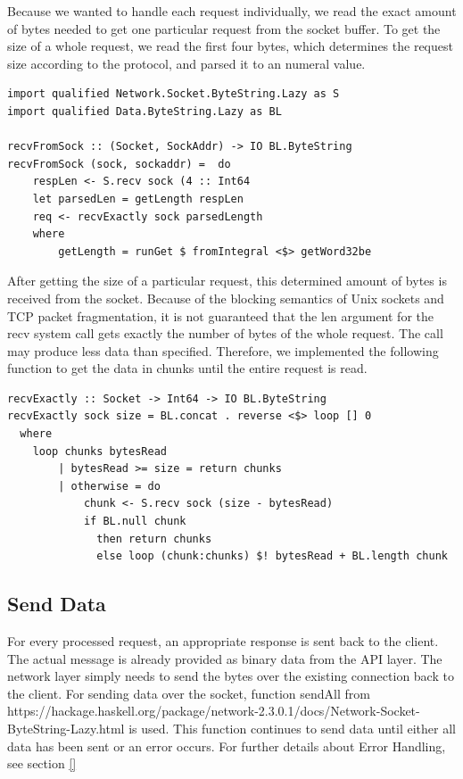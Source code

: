 Because we wanted to handle each request individually, we read
the exact amount of bytes needed to get one particular request from
the socket buffer. To get the size of a whole request, we read the first four
bytes, which determines the request size according to the protocol, and parsed it
to an numeral value.

\begin{lstlisting}[caption={Receiving data from socket}]
import qualified Network.Socket.ByteString.Lazy as S 
import qualified Data.ByteString.Lazy as BL

recvFromSock :: (Socket, SockAddr) -> IO BL.ByteString
recvFromSock (sock, sockaddr) =  do 
    respLen <- S.recv sock (4 :: Int64
    let parsedLen = getLength respLen
    req <- recvExactly sock parsedLength 
    where
        getLength = runGet $ fromIntegral <$> getWord32be
\end{lstlisting}

After getting the size of a particular request, this determined amount of bytes
is received from the socket. Because of the blocking semantics of Unix sockets and
TCP packet fragmentation, it is not guaranteed that the len argument for the recv
system call gets exactly the number of bytes of the whole request. The call may produce
less data than specified. Therefore, we implemented the following function to get
the data in chunks until the entire request is read. 

\begin{lstlisting}[caption={Receive exactly amount of bytes}]
recvExactly :: Socket -> Int64 -> IO BL.ByteString 
recvExactly sock size = BL.concat . reverse <$> loop [] 0 
  where
    loop chunks bytesRead
        | bytesRead >= size = return chunks
        | otherwise = do  
            chunk <- S.recv sock (size - bytesRead)
            if BL.null chunk 
              then return chunks 
              else loop (chunk:chunks) $! bytesRead + BL.length chunk 
\end{lstlisting}

\subsection{Send Data}
\label{sec:impl-broker-socket-send}
For every processed request, an appropriate response is sent back to the client.
The actual message is already provided as binary data from the API layer. The
network layer simply needs to send the bytes over the existing connection back
to the client. For sending data over the socket, function sendAll from 
{https://hackage.haskell.org/package/network-2.3.0.1/docs/Network-Socket-ByteString-Lazy.html}
is used. This function continues to send data until either all data has been
sent or an error occurs. For further details about Error Handling, see
section \ref{}

